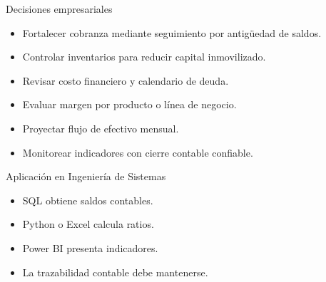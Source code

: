 \begin{frame}{Decisiones empresariales}
\begin{itemize}
  \item Fortalecer cobranza mediante seguimiento por antigüedad de saldos.
  \item Controlar inventarios para reducir capital inmovilizado.
  \item Revisar costo financiero y calendario de deuda.
  \item Evaluar margen por producto o línea de negocio.
  \item Proyectar flujo de efectivo mensual.
  \item Monitorear indicadores con cierre contable confiable.
\end{itemize}
\end{frame}

\begin{frame}{Aplicación en Ingeniería de Sistemas}
\begin{center}
\end{center}
\begin{itemize}
  \item SQL obtiene saldos contables.
  \item Python o Excel calcula ratios.
  \item Power BI presenta indicadores.
  \item La trazabilidad contable debe mantenerse.
\end{itemize}
\end{frame}

